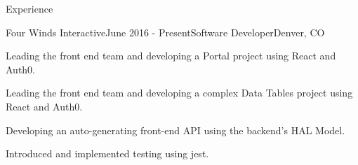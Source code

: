 \documentclass{resume} %
\begin{document}

\begin{rSection}{Experience}

\begin{rSubsection}{Four Winds Interactive}{June 2016 - Present}{Software Developer}{Denver, CO}
\item Leading the front end team and developing a Portal project using React and Auth0.
\item Leading the front end team and developing a complex Data Tables project using React and Auth0.
\item Developing an auto-generating front-end API using the backend's HAL Model.
\item Introduced and implemented testing using jest.
\end{rSubsection}



\end{rSection}
\end{document}
